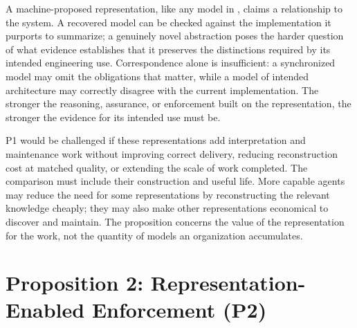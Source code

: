 
A machine-proposed representation, like any model in , claims a relationship to the system. A recovered model can be checked against the implementation it purports to summarize; a genuinely novel abstraction poses the harder question of what evidence establishes that it preserves the distinctions required by its intended engineering use. Correspondence alone is insufficient: a synchronized model may omit the obligations that matter, while a model of intended architecture may correctly disagree with the current implementation. The stronger the reasoning, assurance, or enforcement built on the representation, the stronger the evidence for its intended use must be.


P1 would be challenged if these representations add interpretation and maintenance work without improving correct delivery, reducing reconstruction cost at matched quality, or extending the scale of work completed. The comparison must include their construction and useful life. More capable agents may reduce the need for some representations by reconstructing the relevant knowledge cheaply; they may also make other representations economical to discover and maintain. The proposition concerns the value of the representation for the work, not the quantity of models an organization accumulates.

\section{Proposition 2: Representation-Enabled Enforcement (P2)}\label{heading:p2-representation-enabled-enforcement}

